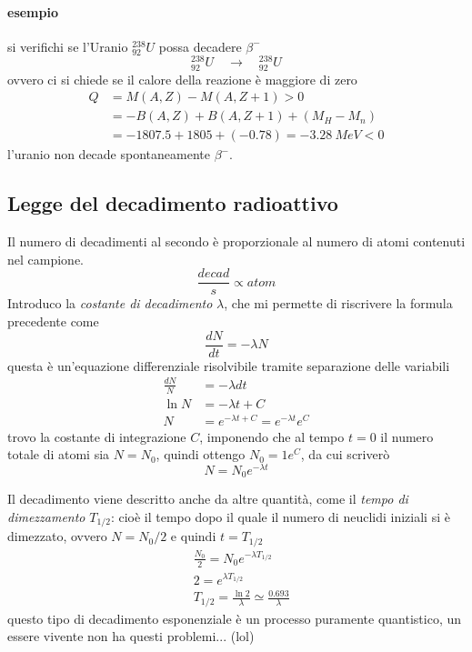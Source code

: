 \paragraph{esempio} si verifichi se l'Uranio $^{238}_{92}U$ possa decadere $\beta^-$
\begin{equation}
^{238}_{92}U \quad\longrightarrow\quad ^{238}_{92}U 
\end{equation}
ovvero ci si chiede se il calore della reazione è maggiore di zero
\begin{equation}
\begin{split}
Q & = M(A,Z) - M(A,Z+1) > 0 \\
& = -B(A,Z) + B(A,Z+1) + (M_H - M_n) \\
& = -1807.5 + 1805 + (-0.78) = - \SI{3.28}{MeV} < 0
\end{split}
\end{equation}
l'uranio non decade spontaneamente $\beta^-$.


\subsection{Legge del decadimento radioattivo}
Il numero di decadimenti al secondo è proporzionale al numero di atomi contenuti nel campione.
$$\frac{decad}{s} \propto atom$$
Introduco la \emph{costante di decadimento} $\lambda$, che mi permette di riscrivere la formula precedente come
\begin{equation}
\frac{dN}{dt} = - \lambda N
\end{equation}
questa è un'equazione differenziale risolvibile tramite separazione delle variabili
\begin{equation}
\begin{split}
\frac{dN}{N} & = - \lambda dt \\
\ln N & = -\lambda t + C \\
N & = e^{-\lambda t + C} = e^{-\lambda t } e^C 
\end{split}
\end{equation}
trovo la costante di integrazione $C$, imponendo che al tempo $t=0$ il numero totale di atomi sia $N=N_0$,
quindi ottengo $N_0 = 1 e^C$, da cui scriverò
\begin{equation}
N = N_0 e^{-\lambda t} 
\label{eq_decad}
\end{equation}

Il decadimento viene descritto anche da altre quantità, come il \emph{tempo di dimezzamento} $T_{1/2}$: cioè il tempo dopo il quale il numero di neuclidi iniziali si è dimezzato, ovvero $N = N_0 / 2$ e quindi $t= T_{1/2}$
\begin{equation}
\begin{split}
& \frac{N_0}{2} = N_0 e^{-\lambda T_{1/2}} \\
& 2 = e^{ \lambda T_{1/2} } \\
& T_{1/2} = \frac{\ln 2}{\lambda} \simeq \frac{0.693}{\lambda}
\end{split}
\end{equation}
questo tipo di decadimento esponenziale è un processo puramente quantistico, un essere vivente non ha questi problemi... (lol)

